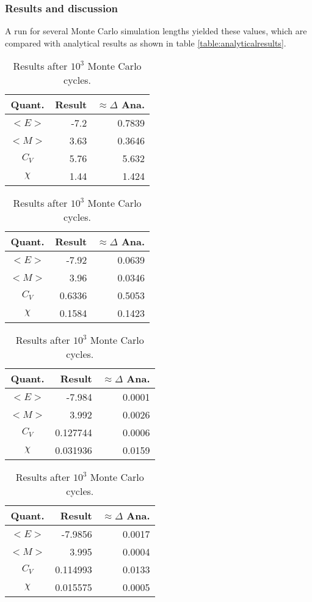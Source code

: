\documentclass[11pt,a4paper,notitlepage,twocolumn]{article}
\begin{document}
\subsubsection{Results and discussion}
A run for several Monte Carlo simulation lengths yielded these values, which are compared with analytical results as shown in table \ref{table:analyticalresults}.
\begin{table}[H]\center
\begin{tabular}{|c|r|r|}\hline
	Quant.& Result & $\approx\Delta$ Ana.\\ \hline
	$<E>$ &-7.2    & 0.7839 \\ \hline
	$<M>$ & 3.63   & 0.3646 \\ \hline
	$C_V$ & 5.76   & 5.632 \\ \hline
	$\chi$& 1.44   & 1.424 \\ \hline
\end{tabular}
\caption{Results after $10^1$ Monte Carlo cycles.}\label{table:4bresults10}
\begin{tabular}{|c|r|r|}\hline
	Quant.& Result & $\approx\Delta$ Ana.\\ \hline
	$<E>$ &-7.92   & 0.0639 \\ \hline
	$<M>$ & 3.96   & 0.0346 \\ \hline
	$C_V$ & 0.6336   & 0.5053 \\ \hline
	$\chi$& 0.1584   & 0.1423 \\ \hline
\end{tabular}
\caption{Results after $10^2$ Monte Carlo cycles.}\label{table:4bresults100}
\begin{tabular}{|c|r|r|}\hline
	Quant.& Result & $\approx\Delta$ Ana.\\ \hline
	$<E>$ &-7.984  & 0.0001 \\ \hline
	$<M>$ & 3.992  & 0.0026 \\ \hline
	$C_V$ & 0.127744 & 0.0006 \\ \hline
	$\chi$& 0.031936 & 0.0159 \\ \hline
\end{tabular}
\caption{Results after $10^3$ Monte Carlo cycles.}\label{table:4bresults1000}
\begin{tabular}{|c|r|r|}\hline
	Quant.& Result & $\approx\Delta$ Ana.\\ \hline
	$<E>$ &-7.9856    & 0.0017 \\ \hline
	$<M>$ & 3.995    & 0.0004 \\ \hline
	$C_V$ & 0.114993   & 0.0133 \\ \hline
	$\chi$& 0.015575   & 0.0005 \\ \hline

\end{tabular}
\end{table}
\end{document}
